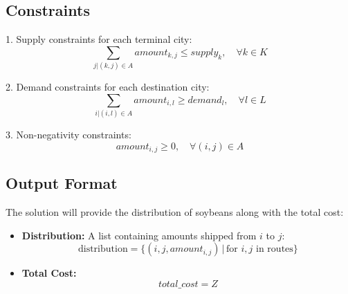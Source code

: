 \documentclass{article}
\begin{document}
\subsection*{Constraints}
1. Supply constraints for each terminal city:
\[
\sum_{j | (k,j) \in A} amount_{k,j} \leq supply_{k}, \quad \forall k \in K
\]

2. Demand constraints for each destination city:
\[
\sum_{i | (i,l) \in A} amount_{i,l} \geq demand_{l}, \quad \forall l \in L
\]

3. Non-negativity constraints:
\[
amount_{i,j} \geq 0, \quad \forall (i,j) \in A
\]

\subsection*{Output Format}
The solution will provide the distribution of soybeans along with the total cost:
\begin{itemize}
    \item \textbf{Distribution:} A list containing amounts shipped from \( i \) to \( j \):
    \[
    \text{distribution} = \{(i, j, amount_{i,j}) \, | \, \text{for } i,j \text{ in routes}\}
    \]
    \item \textbf{Total Cost:} 
    \[
    total\_cost = Z
    \]
\end{itemize}
\end{document}
